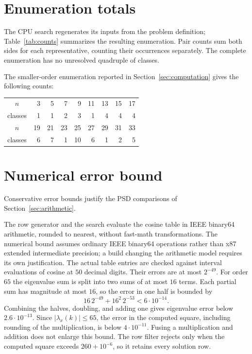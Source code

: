\documentclass[11pt]{article}
\begin{document}
\clearpage
\begin{appendices}
\section{Enumeration totals}\label{app:exhaustion}
The CPU search regenerates its inputs from the problem definition;
Table~\ref{tab:counts} summarizes the resulting enumeration. Pair counts
sum both sides for each representative, counting their occurrences separately.
The complete enumeration has no unresolved quadruple of classes.



The smaller-order enumeration reported in
Section~\ref{sec:computation} gives the following counts:
\begin{center}\small
\begin{tabular}{c|rrrrrrrr}
$n$&3&5&7&9&11&13&15&17\\
classes&1&1&2&3&1&4&4&4\\
$n$&19&21&23&25&27&29&31&33\\
classes&6&7&1&10&6&1&2&5
\end{tabular}
\end{center}

\section{Numerical error bound}\label{app:numerics}
Conservative error bounds justify the PSD comparisons of
Section~\ref{sec:arithmetic}.

The row generator and the search evaluate the cosine table in IEEE binary64
arithmetic, rounded to nearest, without fast-math transformations.
The numerical
bound assumes ordinary IEEE binary64 operations rather than x87 extended
intermediate precision; a build changing the arithmetic model requires
its own justification. The actual table entries are checked against interval evaluations of cosine
at $50$ decimal digits. Their errors are at most $2^{-49}$.
For order $65$ the eigenvalue sum is split into two sums of at most $16$
terms. Each partial sum has magnitude at most $16$, so the error in one
half is bounded by
\[
 16\,2^{-49}+16^2\,2^{-53}<6\cdot10^{-14}.
\]
Combining the halves, doubling, and adding one gives eigenvalue error below
$2.6\cdot10^{-13}$. Since $|\lambda_x(k)|\leq65$, the error in the
computed square, including rounding of the multiplication, is below
$4\cdot10^{-11}$. Fusing a multiplication and addition does not enlarge
this bound. The row filter rejects only when the computed square exceeds
$260+10^{-6}$, so it retains every solution row.



\end{appendices}
\end{document}
